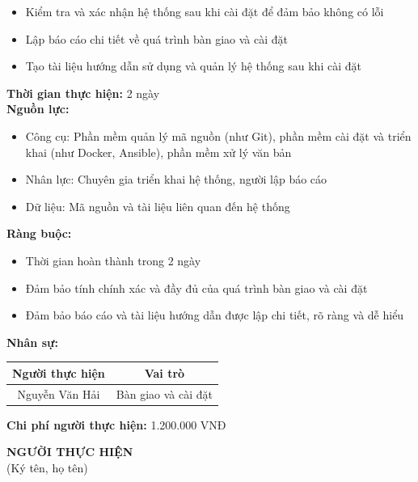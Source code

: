 {\begin{minipage}{\textwidth}
\begin{itemize}
        \item Kiểm tra và xác nhận hệ thống sau khi cài đặt để đảm bảo không có lỗi
        \item Lập báo cáo chi tiết về quá trình bàn giao và cài đặt
        \item Tạo tài liệu hướng dẫn sử dụng và quản lý hệ thống sau khi cài đặt
    \end{itemize}
    \vspace{0.5cm}
    \noindent \textbf{Thời gian thực hiện:} 2 ngày \\
    \noindent \textbf{Nguồn lực:}
    \begin{itemize}
        \item Công cụ: Phần mềm quản lý mã nguồn (như Git), phần mềm cài đặt và triển khai (như Docker, Ansible), phần mềm xử lý văn bản
        \item Nhân lực: Chuyên gia triển khai hệ thống, người lập báo cáo
        \item Dữ liệu: Mã nguồn và tài liệu liên quan đến hệ thống
    \end{itemize}
    \vspace{0.5cm}
    \noindent \textbf{Ràng buộc:}
    \begin{itemize}
        \item Thời gian hoàn thành trong 2 ngày
        \item Đảm bảo tính chính xác và đầy đủ của quá trình bàn giao và cài đặt
        \item Đảm bảo báo cáo và tài liệu hướng dẫn được lập chi tiết, rõ ràng và dễ hiểu
    \end{itemize}
    \vspace{0.5cm}
    \noindent \textbf{Nhân sự:}
    \begin{longtable}{|c|c|}
    \hline
    \textbf{Người thực hiện} & \textbf{Vai trò} \\
    \hline
    Nguyễn Văn Hải & Bàn giao và cài đặt \\
    \hline
    \end{longtable}
    \vspace{0.5cm}
    \noindent \textbf{Chi phí người thực hiện:} 1.200.000 VNĐ \\
    \vspace{1cm}
    \begin{flushleft}
        \hspace{8cm} \textbf{NGƯỜI THỰC HIỆN} \\
        \hspace{8.8cm} (Ký tên, họ tên) \\
        \vspace{1cm}
    \end{flushleft}
    \end{minipage}
}
% 
